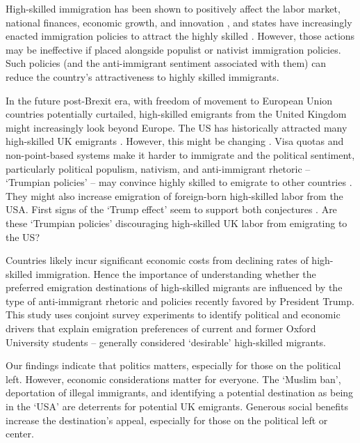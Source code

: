 \documentclass[12pt]{article}
\begin{document}
\par High-skilled immigration has been shown to positively affect the labor market, national finances, economic growth, and innovation \citep{Chaloff2009,Hunt2010,OECD2014}, and states have increasingly enacted immigration policies to attract the highly skilled \citep{Betts2011}. However, those actions may be ineffective if placed alongside populist or nativist immigration policies. Such policies (and the anti-immigrant sentiment associated with them) can reduce the country's attractiveness to highly skilled immigrants.

\par In the future post-Brexit era, with freedom of movement to European Union countries potentially curtailed, high-skilled emigrants from the United Kingdom might increasingly look beyond Europe. The US has historically attracted many high-skilled UK emigrants \citep{Khoo2014}. However, this might be changing \citep{USCIS2017}. Visa quotas and non-point-based systems make it harder to immigrate and the political sentiment, particularly political populism, nativism, and anti-immigrant rhetoric -- `Trumpian policies' -- may convince highly skilled to emigrate to other countries \citep{Czaika2017,Czaika2017b}. They might also increase emigration of foreign-born high-skilled labor from the USA. First signs of the `Trump effect' seem to support both conjectures \citep{Murnane2017}. Are these `Trumpian policies' discouraging high-skilled UK labor from emigrating to the US?

\par Countries likely incur significant economic costs from declining rates of high-skilled immigration.  Hence the importance of understanding whether the preferred emigration destinations of high-skilled migrants are influenced by the type of anti-immigrant rhetoric and policies recently favored by President Trump. This study uses conjoint survey experiments to identify political and economic drivers that explain emigration preferences of current and former Oxford University students -- generally considered `desirable' high-skilled migrants. 

\par Our findings indicate that politics matters, especially for those on the political left. However, economic considerations matter for everyone. The `Muslim ban', deportation of illegal immigrants, and identifying a potential destination as being in the `USA' are deterrents for potential UK emigrants.  Generous social benefits increase the destination's appeal, especially for those on the political left or center.
\end{document}
